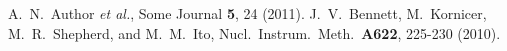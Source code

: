 \documentclass[aps,prd,reprint]{revtex4-1}
\begin{document}
\begin{thebibliography}{99}

 A.~N.~Author {\it et al.}, Some Journal {\bf 5}, 24 (2011).
  J.~V.~Bennett, M.~Kornicer, M.~R.~Shepherd, and M.~M.~Ito,
  Nucl.\ Instrum.\ Meth.\  {\bf A622}, 225-230 (2010).

\end{thebibliography}
\end{document}
